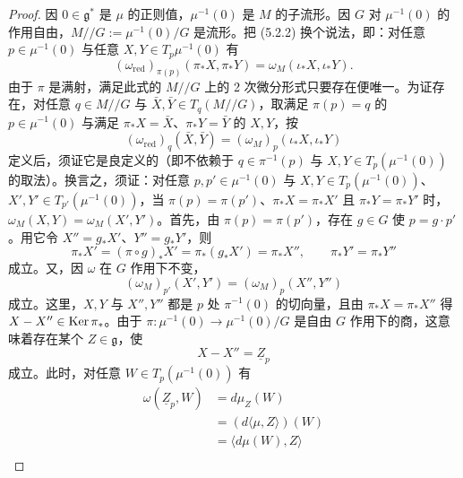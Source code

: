 \begin{proof}
  因 $0\in\mathfrak{g}^*$ 是 $\mu$ 的正则值，$\mu^{-1}(0)$ 是 $M$ 的子流形。因 $G$ 对 $\mu^{-1}(0)$ 的作用自由，$M/\!\!/G:=\mu^{-1}(0)/G$ 是流形。把 (5.2.2) 换个说法，即：对任意 $p\in\mu^{-1}(0)$ 与任意 $X,Y\in T_p\mu^{-1}(0)$ 有
  \begin{equation}
    (\omega_{\mathrm{red}})_{\pi(p)}(\pi_*X,\pi_*Y)=\omega_M(\iota_*X,\iota_*Y).
    \tag{5.2.3}
  \end{equation}
  由于 $\pi$ 是满射，满足此式的 $M/\!\!/G$ 上的 2 次微分形式只要存在便唯一。为证存在，对任意 $q\in M/\!\!/G$ 与 $\bar X,\bar Y\in T_q(M/\!\!/G)$，取满足 $\pi(p)=q$ 的 $p\in\mu^{-1}(0)$ 与满足 $\pi_*X=\bar X$、$\pi_*Y=\bar Y$ 的 $X,Y$，按
  \begin{equation}
    (\omega_{\mathrm{red}})_q(\bar X,\bar Y)=(\omega_M)_p(\iota_*X,\iota_*Y)
    \tag{5.2.4}
  \end{equation}
  定义后，须证它是良定义的（即不依赖于 $q\in\pi^{-1}(p)$ 与 $X,Y\in T_p(\mu^{-1}(0))$ 的取法）。换言之，须证：对任意 $p,p'\in\mu^{-1}(0)$ 与 $X,Y\in T_p(\mu^{-1}(0))$、$X',Y'\in T_{p'}(\mu^{-1}(0))$，当 $\pi(p)=\pi(p')$、$\pi_*X=\pi_*X'$ 且 $\pi_*Y=\pi_*Y'$ 时，$\omega_M(X,Y)=\omega_M(X',Y')$。首先，由 $\pi(p)=\pi(p')$，存在 $g\in G$ 使 $p=g\cdot p'$。用它令 $X''=g_*X'$、$Y''=g_*Y'$，则
  \begin{equation}
    \pi_*X'=(\pi\circ g)_*X'=\pi_*(g_*X')=\pi_*X'',\qquad \pi_*Y'=\pi_*Y''
    \tag{5.2.5}
  \end{equation}
  成立。又，因 $\omega$ 在 $G$ 作用下不变，
  \begin{equation}
    (\omega_M)_{p'}(X',Y')=(\omega_M)_p(X'',Y'')
    \tag{5.2.6}
  \end{equation}
  成立。这里，$X,Y$ 与 $X'',Y''$ 都是 $p$ 处 $\pi^{-1}(0)$ 的切向量，且由 $\pi_*X=\pi_*X''$ 得 $X-X''\in\operatorname{Ker}\pi_*$。由于 $\pi\colon\mu^{-1}(0)\to\mu^{-1}(0)/G$ 是自由 $G$ 作用下的商，这意味着存在某个 $Z\in\mathfrak{g}$，使
  \begin{equation}
    X-X''=\underline{Z}_p
    \tag{5.2.7}
  \end{equation}
  成立。此时，对任意 $W\in T_p(\mu^{-1}(0))$ 有
  \begin{align}
    \omega(\underline{Z}_p,W)&=d\mu_Z(W) \tag{5.2.8}\\
    &=(d\langle\mu,Z\rangle)(W) \tag{5.2.9}\\
    &=\langle d\mu(W),Z\rangle \tag{5.2.10}\\

\end{align}
\end{proof}
